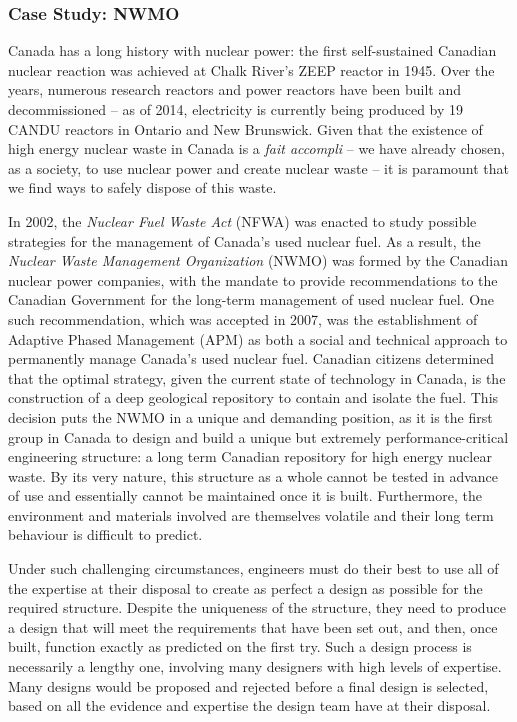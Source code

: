 \subsubsection{Case Study: NWMO}
Canada has a long history with nuclear power: the first self-sustained Canadian nuclear reaction was achieved at Chalk River's ZEEP reactor in 1945. Over the years, numerous research reactors and power reactors have been built and decommissioned -- as of 2014, electricity is currently being produced by 19 CANDU reactors in Ontario and New Brunswick. Given that the existence of high energy nuclear waste in Canada is a \emph{fait accompli} -- we have already chosen, as a society, to use nuclear power and create nuclear waste --  it is paramount that we find ways to safely dispose of this waste. 
\par
In 2002, the \textit{Nuclear Fuel Waste Act} (NFWA) was enacted to study possible strategies for the management of Canada's used nuclear fuel. As a result, the \textit{Nuclear Waste Management Organization} (NWMO) was formed by the Canadian nuclear power companies, with the mandate to provide recommendations to the Canadian Government for the long-term management of used nuclear fuel. One such recommendation, which was accepted in 2007, was the establishment of Adaptive Phased Management (APM) as both a social and technical approach to permanently manage Canada's used nuclear fuel. Canadian citizens determined that the optimal strategy, given the current state of technology in Canada, is the construction of a deep geological repository to contain and isolate the fuel.
\newl
This decision puts the NWMO in a unique and demanding position, as it is the first group in Canada to design and build a unique but extremely performance-critical engineering structure: a long term Canadian repository for high energy nuclear waste. By its very nature, this structure as a whole cannot be tested in advance of use and essentially cannot be maintained once it is built. Furthermore, the environment and materials involved are themselves volatile and their long term behaviour is difficult to predict.
\par
Under such challenging circumstances, engineers must do their best to use all of the expertise at their disposal to create as perfect a design as possible for the required structure. Despite the uniqueness of the structure, they need to produce a design that will meet the requirements that have been set out, and then, once built, function exactly as predicted on the first try.  Such a design process is necessarily a lengthy one, involving many designers with high levels of expertise. Many designs would be proposed and rejected before a final design is selected, based on all the evidence and expertise the design team have at their disposal.

